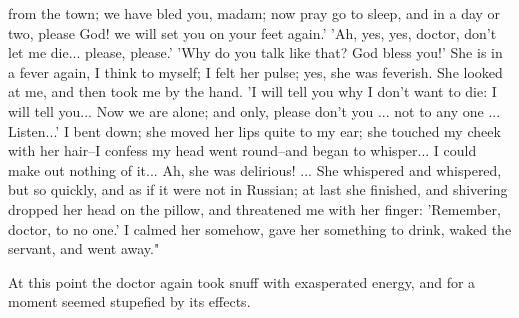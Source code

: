 from the town; we have bled you, madam; now pray go to sleep, and in a
day or two, please God! we will set you on your feet again.' 'Ah, yes,
yes, doctor, don't let me die... please, please.' 'Why do you talk
like that? God bless you!' She is in a fever again, I think to myself;
I felt her pulse; yes, she was feverish. She looked at me, and then
took me by the hand. 'I will tell you why I don't want to die: I will
tell you... Now we are alone; and only, please don't you ... not to
any one ... Listen...' I bent down; she moved her lips quite to my
ear; she touched my cheek with her hair--I confess my head went
round--and began to whisper... I could make out nothing of it... Ah,
she was delirious! ... She whispered and whispered, but so quickly,
and as if it were not in Russian; at last she finished, and shivering
dropped her head on the pillow, and threatened me with her finger:
'Remember, doctor, to no one.' I calmed her somehow, gave her
something to drink, waked the servant, and went away."

At this point the doctor again took snuff with exasperated energy, and
for a moment seemed stupefied by its effects.

